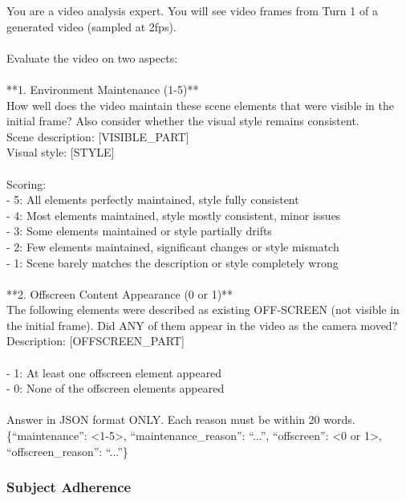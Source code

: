 \begin{tcolorbox}[d2box, title={Scene Adherence Prompt}]
\ttfamily\scriptsize
You are a video analysis expert. You will see video frames from Turn 1 of a generated video (sampled at 2fps).\\
\\
Evaluate the video on two aspects:\\
\\
**1. Environment Maintenance (1-5)**\\
How well does the video maintain these scene elements that were visible in the initial frame? Also consider whether the visual style remains consistent.\\
Scene description: [VISIBLE\_PART]\\
Visual style: [STYLE]\\
\\
Scoring:\\
- 5: All elements perfectly maintained, style fully consistent\\
- 4: Most elements maintained, style mostly consistent, minor issues\\
- 3: Some elements maintained or style partially drifts\\
- 2: Few elements maintained, significant changes or style mismatch\\
- 1: Scene barely matches the description or style completely wrong\\
\\
**2. Offscreen Content Appearance (0 or 1)**\\
The following elements were described as existing OFF-SCREEN (not visible in the initial frame). Did ANY of them appear in the video as the camera moved?\\
Description: [OFFSCREEN\_PART]\\
\\
- 1: At least one offscreen element appeared\\
- 0: None of the offscreen elements appeared\\
\\
Answer in JSON format ONLY. Each reason must be within 20 words.\\
\{``maintenance'': <1-5>, ``maintenance\_reason'': ``...'', ``offscreen'': <0 or 1>, ``offscreen\_reason'': ``...''\}
\end{tcolorbox}

\subsubsection{Subject Adherence}
\label{app:subject_adherence_detail}

